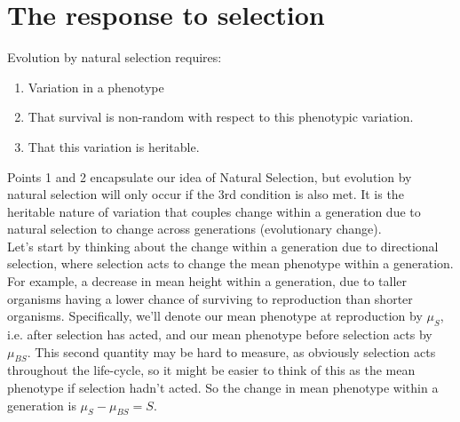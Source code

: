 \chapter{The response to selection}
Evolution by natural selection requires:
\begin{enumerate}
\item Variation in a phenotype
\item That survival is non-random with respect to this phenotypic
variation.
\item That this variation is heritable.
\end{enumerate}
Points 1 and 2 encapsulate our idea of Natural Selection, but evolution by natural
selection will only occur if the 3rd condition is also met. It is the
heritable nature of variation that couples change within a generation
due to natural selection to change across generations (evolutionary
change). \\

Let's start by thinking about the change within a generation due
to directional selection, where selection acts to change the mean
phenotype within a generation. For example, a decrease in mean height within a
generation, due to taller organisms having a lower chance of surviving
to reproduction than shorter organisms. Specifically, we'll denote our mean phenotype at
reproduction by $\mu_S$, i.e. after selection has acted, and our mean
phenotype before selection acts by $\mu_{BS}$. This second quantity may be hard to
measure, as obviously selection acts throughout the life-cycle, so it
might be easier to think of this as the mean phenotype if selection
hadn't acted. So the change in mean phenotype within a generation is $\mu_{S} - \mu_{BS}= S$.  \\

